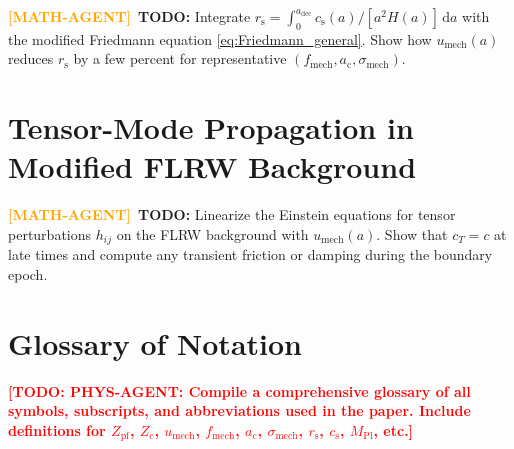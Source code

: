 \documentclass[11pt,a4paper]{article}
\newcommand{\dx}{\mathrm{d}}
\newcommand{\ac}{a_{\mathrm{c}}}
\newcommand{\rs}{r_{\mathrm{s}}}
\newcommand{\cs}{c_{\mathrm{s}}}
\newcommand{\mpl}{M_{\mathrm{Pl}}}
\newcommand{\sigmamech}{\sigma_{\mathrm{mech}}}
\newcommand{\fmech}{f_{\mathrm{mech}}}
\newcommand{\umech}{u_{\mathrm{mech}}}
\newcommand{\Zpf}{Z_{\mathrm{pf}}}
\newcommand{\Zcond}{Z_{\mathrm{c}}}
\theoremstyle{definition}
\newcommand{\TODO}[1]{\textcolor{red}{\textbf{[TODO: #1]}}}
\newcommand{\MATHAGENT}{\textcolor{orange}{\textbf{[MATH-AGENT]}}}
\begin{document}
\MATHAGENT~\textbf{TODO:} Integrate $\rs = \int_0^{a_{\mathrm{dec}}} \cs(a)/[a^2 H(a)] \, \dx a$ with the modified Friedmann equation \eqref{eq:Friedmann_general}. Show how $\umech(a)$ reduces $\rs$ by a few percent for representative $(\fmech, \ac, \sigmamech)$.

\section{Tensor-Mode Propagation in Modified FLRW Background}
\label{app:tensor_modes}

\MATHAGENT~\textbf{TODO:} Linearize the Einstein equations for tensor perturbations $h_{ij}$ on the FLRW background with $\umech(a)$. Show that $c_T = c$ at late times and compute any transient friction or damping during the boundary epoch.

\section{Glossary of Notation}
\label{app:notation}

\TODO{PHYS-AGENT: Compile a comprehensive glossary of all symbols, subscripts, and abbreviations used in the paper. Include definitions for $\Zpf$, $\Zcond$, $\umech$, $\fmech$, $\ac$, $\sigmamech$, $\rs$, $\cs$, $\mpl$, etc.}
\end{document}
